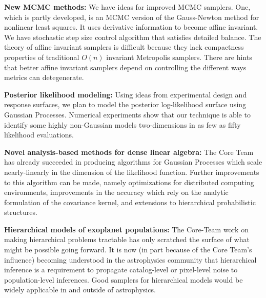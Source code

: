 \documentclass[12pt]{article}
\begin{document}
\textbf{New MCMC methods:}
We have ideas for improved MCMC samplers.
One, which is partly developed, is an MCMC version of the Gauss-Newton
method for nonlinear least squares.
It uses derivative information to become affine invariant.
We have stochastic step size control algorithm that satisfies
detailed balance.
The theory of affine invariant samplers is difficult because they
lack compactness properties of traditional $O(n)$ invariant Metropolis
samplers.
There are hints that better affine invariant samplers depend on 
controlling the different ways metrics can detegenerate.




\textbf{Posterior likelihood modeling:}
Using ideas from experimental design and response surfaces, we plan to 
model the posterior log-likelihood surface using
Gaussian Processes.
Numerical experiments show that our technique is able to
identify some highly non-Gaussian models two-dimensions in as few as
fifty likelihood evaluations.

\textbf{Novel analysis-based methods for dense linear algebra:}
The Core Team has already succeeded in producing algorithms for Gaussian
Processes which scale nearly-linearly in the dimension of the likelihood
function.
Further improvements to this algorithm can be made, namely optimizations
for distributed computing environments, improvements in the accuracy
which rely on the analytic formulation of the covariance kernel, and
extensions to hierarchical probabilistic structures.

\textbf{Hierarchical models of exoplanet populations:}
The Core-Team work on making hierarchical problems tractable has
only scratched the surface of what might be possible going forward.
It is now (in part because of the Core Team's influence) becoming
understood in the astrophysics community that hierarchical inference
is a requirement to propagate catalog-level or pixel-level noise to
population-level inferences.
Good samplers for hierarchical models would be widely applicable in
and outside of astrophysics.
\end{document}
